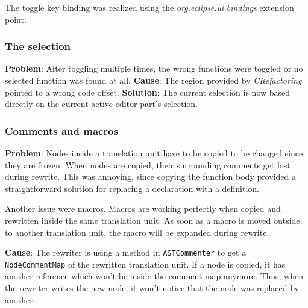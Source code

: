 The toggle key binding was realized using the \textit{org.eclipse.ui.bindings} 
extension point.

\subsubsection{The selection}
\textbf{Problem}: After toggling multiple times, the wrong functions were 
toggled or no selected function was found at all. 
\textbf{Cause}: The region provided by \textit{CRefactoring} pointed to a wrong 
code offset. 
\textbf{Solution}: The current selection is now based directly on the current 
active editor part's selection.

\subsubsection{Comments and macros}
\textbf{Problem}: Nodes inside a translation unit have to be copied to be 
changed since they are frozen. When nodes are copied, their surrounding comments 
get lost during rewrite. This was annoying, since copying the function body 
provided a straightforward solution for replacing a declaration with a 
definition.

Another issue were macros. Macros are working perfectly when copied and 
rewritten inside the same translation unit. As soon as a macro is moved outside 
to another translation unit, the macro will be expanded during rewrite. 

\textbf{Cause}: The rewriter is using a method in \texttt{ASTCommenter} to get a 
\texttt{NodeCommentMap} of the rewritten translation unit. If a node is copied, 
it has another reference which won't be inside the comment map anymore. Thus, 
when the rewriter writes the new node, it won't notice that the node was 
replaced by another.

